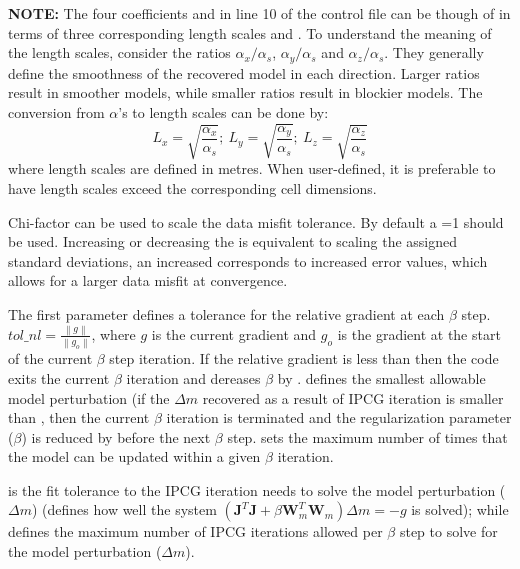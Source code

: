 \begin{description}[leftmargin=5cm, style=sameline, align=left]
\textbf{NOTE:} The four coefficients  and  in line 10 of the control file can be though of in terms of three corresponding length scales  and . To understand the meaning of the length scales, consider the ratios $\alpha_x/\alpha_s$, $\alpha_y/\alpha_s$ and $\alpha_z/\alpha_s$. They generally define the smoothness of the recovered model in each direction. Larger ratios result in smoother models, while smaller ratios result in blockier models. The conversion from $\alpha$'s to length scales can be done by:
\begin{equation}
L_x = \sqrt{\frac{\alpha_x}{\alpha_s}} ; ~L_y = \sqrt{\frac{\alpha_y}{\alpha_s}} ; ~L_z = \sqrt{\frac{\alpha_z}{\alpha_s}}
\end{equation}
where length scales are defined in metres. When user-defined, it is preferable to have length scales exceed the corresponding cell dimensions.
\item[\codeName{chifact}] Chi-factor can be used to scale the data misfit tolerance. By default a =1 should be used. Increasing or decreasing the  is equivalent to scaling the assigned standard deviations, an increased  corresponds to increased error values, which allows for a larger data misfit at convergence. 
\item[\codeName{tol\_nl, mindm, iter\_per\_beta}] The first parameter  defines a tolerance for the relative gradient at each $\beta$ step. $tol\_nl=\frac{\left\|g\right\|}{\left\|g_{o}\right\|}$, where $g$ is the current gradient and $g_o$ is the gradient at the start of the current $\beta$ step iteration. If the relative gradient is less than  then the code exits the current $\beta$ iteration and dereases $\beta$ by .  defines the smallest allowable model perturbation (if the $\Delta m$ recovered as a result of IPCG iteration is smaller than , then the current $\beta$ iteration is terminated and the regularization parameter ($\beta$) is reduced by  before the next $\beta$ step.  sets the maximum number of times that the model can be updated within a given $\beta$ iteration.
\item[\codeName{tol\_ipcg, max\_iter\_ipcg}]  is the fit tolerance to the IPCG iteration needs to solve the model perturbation ($\Delta m$) (defines how well the system $(\mathbf{J}^T\mathbf{J}+\beta\mathbf{W}_m^T\mathbf{W}_m)\Delta m=-g$ is solved); while  defines the maximum number of IPCG iterations allowed per $\beta$ step to solve for the model perturbation ($\Delta m$).

\end{description}
